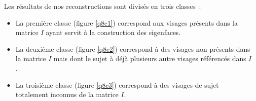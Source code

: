 \documentclass[a4paper]{article}
\begin{document}
Les résultats de nos reconstructions sont divisés en trois classes~:
\begin{itemize}
    \item La première classe (figure \ref{q8c1}) correspond aux visages présents dans la matrice $I$ ayant servit à la construction des
        eigenfaces.
    \item La deuxième classe (figure \ref{q8c2}) correspond à des visages non présents dans la matrice $I$ mais
        dont le sujet à déjà plusieurs autre visages référencés dans $I$.
    \item La troisième classe (figure \ref{q8c3}) correspond à des visages de sujet totalement inconnus de la
        matrice $I$.
\end{itemize}

\begin{figure}[!ht]%
  \centering
  \hspace{0.001\textwidth}
  \hspace{0.001\textwidth}
  \hspace{0.001\textwidth}
  \hspace{0.001\textwidth}

\end{figure}
\end{document}
